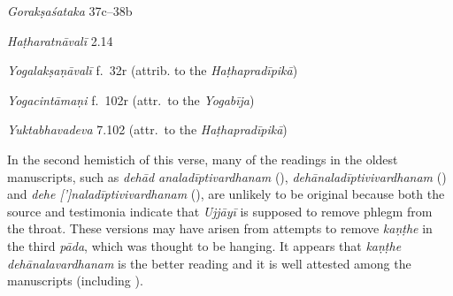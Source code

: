 \begin{ekdosis}
\begin{sources}[hp02_052]
\emph{Gorakṣaśataka} 37c–38b
\begin{versinnote}
\end{versinnote}
\end{sources}

\begin{testimonia}[hp02_052]
\emph{Haṭharatnāvalī} 2.14

\begin{versinnote}
\end{versinnote}

\emph{Yogalakṣaṇāvalī} f.~32r (attrib. to the \emph{Haṭhapradīpikā})
\begin{versinnote}
\end{versinnote}

\emph{Yogacintāmaṇi} f.~102r (attr.~to the \emph{Yogabīja})

\begin{versinnote}
\end{versinnote}

\emph{Yuktabhavadeva} 7.102 (attr.~to the \emph{Haṭhapradīpikā})

\begin{versinnote} 
\end{versinnote}

\end{testimonia}

\begin{philcomm}[hp02_052]
In the second hemistich of this verse, many of the readings in the oldest manuscripts, such as \emph{dehād analadīptivardhanam} (), \emph{dehānaladīptivivardhanam} () and \emph{dehe [’]naladīptivivardhanam} (), are unlikely to be original because both the source and testimonia indicate that \emph{Ujjāyī} is supposed to remove phlegm from the throat. These versions may have arisen from attempts to remove \emph{kaṇṭhe} in the third \emph{pāda}, which was thought to be hanging. It appears that \emph{kaṇṭhe dehānalavardhanam} is the better reading and it is well attested among the manuscripts (including \textalpha).
\end{philcomm}


\end{ekdosis}
